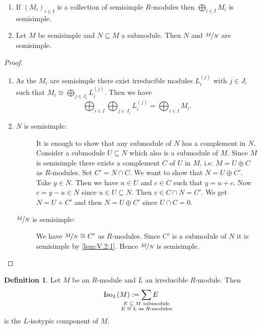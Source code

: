 \documentclass[12pt,a4paper]{scrartcl}
\theoremstyle{cplain}
\theoremstyle{cplain}
\theoremstyle{cplain}
\theoremstyle{definition}
\newtheorem*{deff}{Definition}
\begin{document}
\begin{otherlanguage}{english}
\begin{lem}
  \leavevmode
  \begin{enumerate}
    \item If $(M_i)_{i\in I}$ is a collection of semisimple $R$-modules then $\bigoplus_{i\in I}M_i$ is semisimple. \label{lem:V.2:1}
    \item Let $M$ be semisimple and $N\subseteq M$ a submodule. Then $N$ and $\nicefrac{M}{N}$ are semisimple. \label{lem:V.2:2}
  \end{enumerate}
\end{lem}
\begin{proof}
  \leavevmode
  \begin{enumerate}[label=\ref{lem:V.2:\arabic*}]
    \item As the $M_i$ are semisimple there exist irreducible modules $L_i^{(j)}$ with $j \in J_i$ such that $M_i \cong \bigoplus_{j\in J_i}L_i^{(j)}$. Then we have \[\bigoplus_{i\in I}\bigoplus_{j\in J_i}L_i^{(j)} = \bigoplus_{i\in I} M_i.\]
    
    \vspace{-1cm}
    \item \begin{description}
      \item[$N$ is semisimple:] It is enough to show that any submodule of $N$ has a complement in $N$. Consider a submodule $U\subseteq N$ which also is a submodule of $M$. Since $M$ is semisimple there exists a complement $C$ of $U$ in $M$, i.e. $M= U \oplus C$ as $R$-modules. Set $C' = N\cap C$. We want to show that $N=U \oplus C'$. Take $y \in N$. Then we have $n\in U$ and $c \in C$ such that $y=u+c$. Now $c = y-u\in N$ since $u\in U \subseteq N$. Then $c \in C \cap N = C'$. We get $N = U+C'$ and then $N=U\oplus C'$ since $U\cap C=0$.
      \item[$\nicefrac{M}{N}$ is semisimple:] We have $\nicefrac{M}{N} \cong C'$ as $R$-modules. Since $C'$ is a submodule of $N$ it is semisimple by \ref{lem:V.2:1}. Hence $\nicefrac{M}{N}$ is semisimple.
      \qedhere
    \end{description}
  \end{enumerate}
\end{proof}

\begin{deff}
  Let $M$ be an $R$-module and $L$ an irreducible $R$-module. Then \[\Iso_L(M) := \sum_{\mathclap{\substack{\text{$E \subseteq M$ submodule}\\\text{$E\cong L$ as $R$-modules}}}}E \] is the $L$-isotypic component of $M$.
\end{deff}




\end{otherlanguage}
\end{document}
